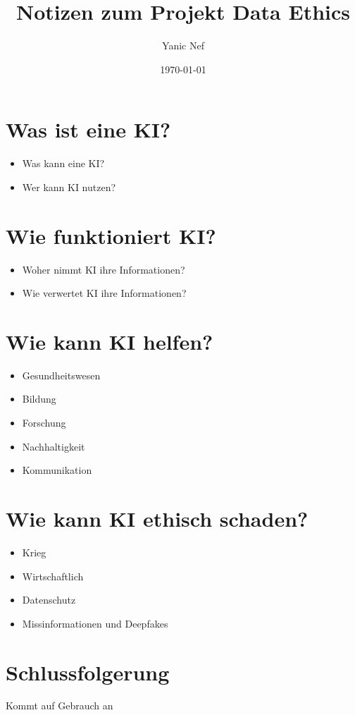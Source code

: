 \documentclass{article}
\title{Notizen zum Projekt Data Ethics}
\author{Yanic Nef}
\date{\today}
\begin{document}
\maketitle


\tableofcontents



\section{Was ist eine KI?}
\begin{itemize}
    \item Was kann eine KI?
    \item Wer kann KI nutzen?
\end{itemize}

\section{Wie funktioniert KI?}
\begin{itemize}
    \item Woher nimmt KI ihre Informationen?
    \item Wie verwertet KI ihre Informationen?
\end{itemize}

\section{Wie kann KI helfen?}
\begin{itemize}
\item Gesundheitswesen
\item Bildung
\item Forschung
\item Nachhaltigkeit
\item Kommunikation
\end{itemize}

\section{Wie kann KI ethisch schaden?}
\begin{itemize}
    \item Krieg
    \item Wirtschaftlich
    \item Datenschutz
    \item Missinformationen und Deepfakes
\end{itemize}

\section{Schlussfolgerung}
Kommt auf Gebrauch an

\printbibliography
\end{document}
